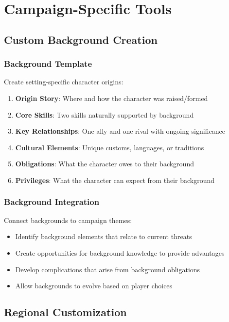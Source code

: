 \documentclass[11pt]{article}
\begin{document}
\section{Campaign-Specific Tools}

\subsection{Custom Background Creation}

\subsubsection{Background Template}

Create setting-specific character origins:

\begin{enumerate}
  \item \textbf{Origin Story}: Where and how the character was raised/formed
  \item \textbf{Core Skills}: Two skills naturally supported by background
  \item \textbf{Key Relationships}: One ally and one rival with ongoing significance
  \item \textbf{Cultural Elements}: Unique customs, languages, or traditions
  \item \textbf{Obligations}: What the character owes to their background
  \item \textbf{Privileges}: What the character can expect from their background
\end{enumerate}

\subsubsection{Background Integration}

Connect backgrounds to campaign themes:

\begin{itemize}
  \item Identify background elements that relate to current threats
  \item Create opportunities for background knowledge to provide advantages
  \item Develop complications that arise from background obligations
  \item Allow backgrounds to evolve based on player choices
\end{itemize}

\subsection{Regional Customization}
\end{document}
